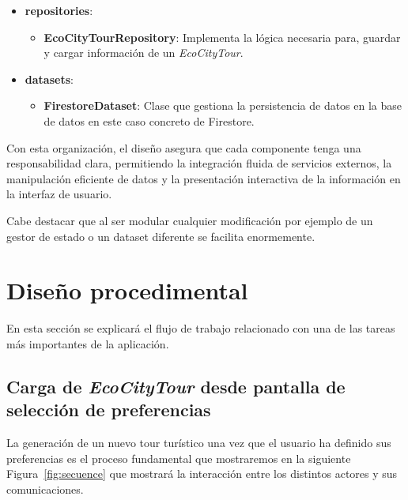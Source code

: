 \begin{itemize}
	\item \textbf{repositories}:
	\begin{itemize}
		\item \textbf{EcoCityTourRepository}: Implementa la lógica necesaria para, guardar y cargar información de un \textit{EcoCityTour}.
	\end{itemize}
	
	\item \textbf{datasets}:
	\begin{itemize}
		\item \textbf{FirestoreDataset}: Clase que gestiona la persistencia de datos en la base de datos en este caso concreto de Firestore.
	\end{itemize}
\end{itemize}

Con esta organización, el diseño asegura que cada componente tenga una responsabilidad clara, permitiendo la integración fluida de servicios externos, la manipulación eficiente de datos y la presentación interactiva de la información en la interfaz de usuario. 

Cabe destacar que al ser modular cualquier modificación por ejemplo de un gestor de estado o un dataset diferente se facilita enormemente.



\section{Diseño procedimental}
En esta sección se explicará el flujo de trabajo relacionado con una de las tareas más importantes de la aplicación.
\subsection{Carga de \textit{EcoCityTour} desde pantalla de selección de preferencias}
La generación de un nuevo tour turístico una vez que el usuario ha definido sus preferencias es el proceso fundamental que mostraremos en la siguiente Figura~\ref{fig:secuence} que mostrará la interacción entre los distintos actores y sus comunicaciones.

